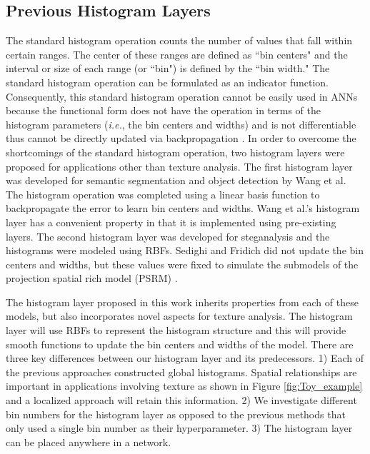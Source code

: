 \documentclass[journal]{IEEEtai}
\begin{document}
	\subsection{Previous Histogram Layers}
	The standard histogram operation counts the number of values that fall within certain ranges. The center of these ranges are defined as ``bin centers" and the interval or size of each range (or ``bin") is defined by the ``bin width." The standard histogram operation can be formulated as an indicator function. Consequently, this standard histogram operation cannot be easily used in ANNs because the functional form does not have the operation in terms of the histogram parameters (\textit{i.e.}, the bin centers and widths) and is not differentiable thus cannot be directly updated via backpropagation \cite{wang2016learnable}. In order to overcome the shortcomings of the standard histogram operation, two histogram layers were proposed for applications other than texture analysis. The first histogram layer was developed for semantic segmentation and object detection \cite{wang2016learnable} by Wang et al. The histogram operation was completed using a linear basis function to backpropagate the error to learn bin centers and widths. Wang et al.'s histogram layer has a convenient property in that it is implemented using pre-existing layers. The second histogram layer was developed for steganalysis \cite{sedighi2017histogram} and the histograms were modeled using RBFs. Sedighi and Fridich did not update the bin centers and widths, but these values were fixed to simulate the submodels of the projection spatial rich model (PSRM) \cite{holub2013random}.
	
	The histogram layer proposed in this work inherits properties from each of these models, but also incorporates novel aspects for texture analysis. The histogram layer will use RBFs to represent the histogram structure and this will provide smooth functions to update the bin centers and widths of the model. There are three key differences between our histogram layer and its predecessors. 1) Each of the previous approaches constructed global histograms. Spatial relationships are important in applications involving texture \cite{ojala2004texture,srinivasan2008statistical} as shown in Figure \ref{fig:Toy_example} and a localized approach will retain this information. 2) We investigate different bin numbers for the histogram layer as opposed to the previous methods that only used a single bin number as their hyperparameter. 3) The histogram layer can be placed anywhere in a network.
\end{document}
